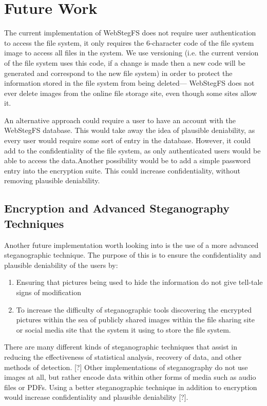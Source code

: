 \documentclass[12pt,journal,compsoc]{IEEEtran}
\begin{document}
\section{Future Work}
The current implementation of WebStegFS does not require user authentication to access the file system, it only requires the 6-character code of the file system image to access all files in the system. We use versioning (i.e. the current version of the file system uses this code, if a change is made then a new code will be generated and correspond to the new file system) in order to protect the information stored in the file system from being deleted--- WebStegFS does not ever delete images from the online file storage site, even though some sites allow it. 

An alternative approach could require a user to have an account with the WebStegFS database. This would take away the idea of plausible deniability, as every user would require some sort of entry in the database. However, it could add to the confidentiality of the file system, as only authenticated users would be able to access the data.Another possibility would be to add a simple password entry into the encryption suite. This could increase confidentiality, without removing plausible deniability.

\subsection{Encryption and Advanced Steganography Techniques}

Another future implementation worth looking into is the use of a more advanced steganographic technique. The purpose of this is to ensure the confidentiality and plausible deniability of the users by:
\begin{enumerate}
\item Ensuring that pictures being used to hide the information do not give tell-tale signs of modification
\item To increase the difficulty of steganographic tools discovering the encrypted pictures within the sea of publicly shared images within the file sharing site or social media site that the system it using to store the file system.
\end{enumerate}

There are many different kinds of steganographic techniques that assist in reducing the effectiveness of statistical analysis, recovery of data, and other methods of detection. [?] Other implementations of steganography do not use images at all, but rather encode data within other forms of media such as audio files or PDFs. Using a better steganographic technique in addition to encryption would increase confidentiality and plausible deniability [?]. 
\end{document}
